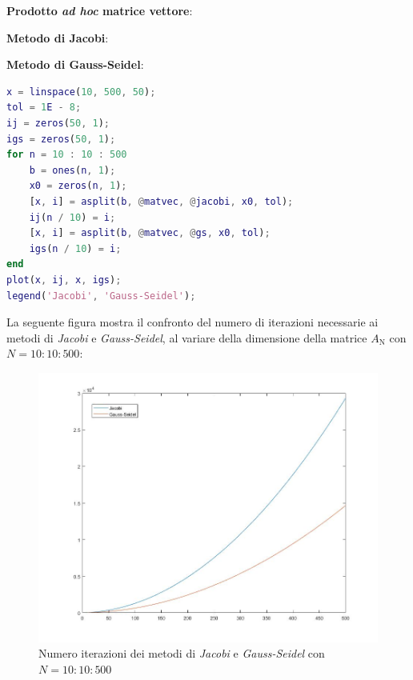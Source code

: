 \textbf{Prodotto \textit{ad hoc} matrice vettore}:

\textbf{Metodo di Jacobi}:

\textbf{Metodo di Gauss-Seidel}:

\begin{lstlisting}[language=Matlab, caption=Codice Matlab]
x = linspace(10, 500, 50);
tol = 1E - 8;
ij = zeros(50, 1);
igs = zeros(50, 1);
for n = 10 : 10 : 500
    b = ones(n, 1);
    x0 = zeros(n, 1);
    [x, i] = asplit(b, @matvec, @jacobi, x0, tol);
    ij(n / 10) = i;
    [x, i] = asplit(b, @matvec, @gs, x0, tol);
    igs(n / 10) = i;
end
plot(x, ij, x, igs);
legend('Jacobi', 'Gauss-Seidel');
\end{lstlisting}
La seguente figura mostra il confronto del numero di iterazioni necessarie ai metodi di \textit{Jacobi} e \textit{Gauss-Seidel}, al variare della dimensione della matrice  $A_\mathrm{N}$ con $N = 10 : 10 : 500$:
\begin{figure}[H]
	\includegraphics[width=\textwidth]{Chapter-6/Exercise-28/plot.jpg}
	\caption*{Numero iterazioni dei metodi di \textit{Jacobi} e \textit{Gauss-Seidel} con $N = 10 : 10 : 500$}
\end{figure}
